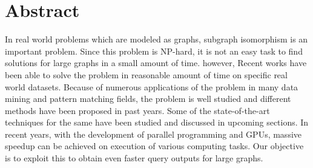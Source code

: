 \documentclass[
10pt, %
a4paper, %
oneside, %
headinclude,footinclude, %
BCOR5mm, %
]{scrartcl}
\title{\normalfont\spacedallcaps{Initial Report on Dynamic Subgraph Isomorphism on GPU}} %
\author{\spacedlowsmallcaps{Shreyas Phanse (CS16M045)}}%
\date{} %
\begin{document}

\renewcommand{\sectionmark}[1]{\markright{\spacedlowsmallcaps{#1}}} %
\lehead{\mbox{\llap{\small\thepage\kern1em\color{halfgray} \vline}\color{halfgray}\hspace{0.5em}\rightmark\hfil}} %

\pagestyle{scrheadings} %


\maketitle %

\setcounter{tocdepth}{2} %

\tableofcontents %

\listoffigures %



\section*{Abstract} %

In real world problems which are modeled as graphs, subgraph isomorphism is an important problem. Since this problem is NP-hard, it is not an easy task to find solutions for large graphs in a small amount of time. however, Recent works have been able to solve the problem in reasonable amount of time on specific real world datasets. Because of numerous applications of the problem in many data mining and pattern matching fields, the problem is well studied and different methods have been proposed in past years. Some of the state-of-the-art techniques for the same have been studied and discussed in upcoming sections. In recent years, with the development of parallel programming and GPUs\cite{book}, massive speedup can be achieved on execution of various computing tasks. Our objective is to exploit this to obtain even faster query outputs for large graphs.
\end{document}
